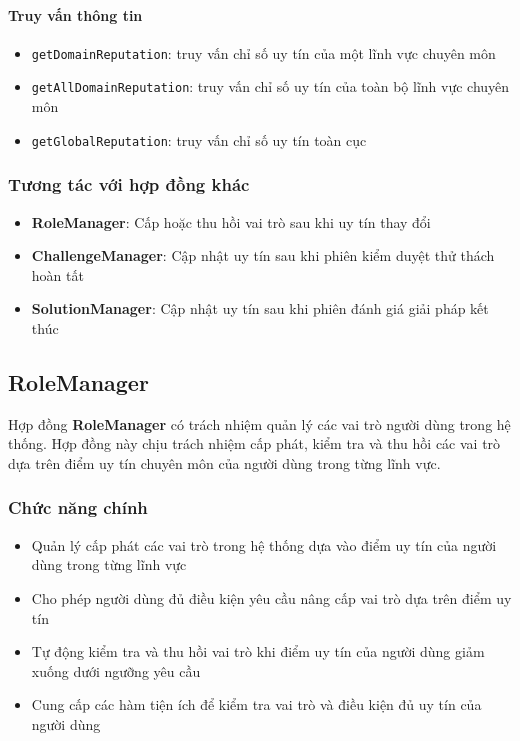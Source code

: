 \paragraph{Truy vấn thông tin}

\begin{itemize}
  \item \texttt{getDomainReputation}: truy vấn chỉ số uy tín của một lĩnh vực chuyên môn
  \item \texttt{getAllDomainReputation}: truy vấn chỉ số uy tín của toàn bộ lĩnh vực chuyên môn
  \item \texttt{getGlobalReputation}: truy vấn chỉ số uy tín toàn cục
\end{itemize}

\subsubsection{Tương tác với hợp đồng khác}

\begin{itemize}
  \item \textbf{RoleManager}: Cấp hoặc thu hồi vai trò sau khi uy tín thay đổi
  \item \textbf{ChallengeManager}: Cập nhật uy tín sau khi phiên kiểm duyệt thử thách hoàn tất
  \item \textbf{SolutionManager}: Cập nhật uy tín sau khi phiên đánh giá giải pháp kết thúc
\end{itemize}

\subsection{RoleManager}

Hợp đồng \textbf{RoleManager} có trách nhiệm quản lý các vai trò người dùng trong hệ thống. Hợp đồng này chịu trách nhiệm cấp phát, kiểm tra và thu hồi các vai trò dựa trên điểm uy tín chuyên môn của người dùng trong từng lĩnh vực.

\subsubsection{Chức năng chính}

\begin{itemize}
  \item Quản lý cấp phát các vai trò trong hệ thống dựa vào điểm uy tín của người dùng trong từng lĩnh vực
  \item Cho phép người dùng đủ điều kiện yêu cầu nâng cấp vai trò dựa trên điểm uy tín
  \item Tự động kiểm tra và thu hồi vai trò khi điểm uy tín của người dùng giảm xuống dưới ngưỡng yêu cầu
  \item Cung cấp các hàm tiện ích để kiểm tra vai trò và điều kiện đủ uy tín của người dùng
\end{itemize}

